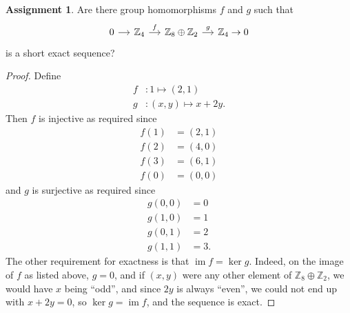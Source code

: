 \documentclass[12pt]{article}
\DeclareMathOperator{\im}{im}
\theoremstyle{definition}
\newtheorem{ex}{Assignment}
\begin{document}
\begin{ex}
	Are there group homomorphisms $f$ and $g$ such that \begin{equation*}
		\begin{tikzcd}[column sep=small]
			0 \arrow[r] & \mathbb{Z}_4 \arrow[r, "f"] & \mathbb{Z}_8 \oplus \mathbb{Z}_2 \arrow[r, "g"] & \mathbb{Z}_4 \to 0
		\end{tikzcd}
	\end{equation*}
	is a short exact sequence?
\end{ex}
\begin{proof}
	Define \begin{align*}
		f & : 1 \mapsto (2, 1) \\ g & : (x, y) \mapsto x + 2y.
	\end{align*}
	Then $f$ is injective as required since \begin{align*}
		f(1) & = (2, 1) \\
		f(2) & = (4, 0) \\
		f(3) & = (6, 1) \\
		f(0) & = (0, 0)
	\end{align*}
	and $g$ is surjective as required since \begin{align*}
		g(0, 0) & = 0  \\
		g(1, 0) & = 1  \\
		g(0, 1) & = 2  \\
		g(1, 1) & = 3.
	\end{align*}
	The other requirement for exactness is that $\im f = \ker g$.
	Indeed, on the image of $f$ as listed above, $g = 0$, and if $(x, y)$ were any other element of $\mathbb{Z}_8 \oplus \mathbb{Z}_2$, we would have $x$ being ``odd'', and since $2y$ is always ``even'', we could not end up with $x + 2y = 0$, so $\ker g = \im f$, and the sequence is exact.
\end{proof}
\end{document}

